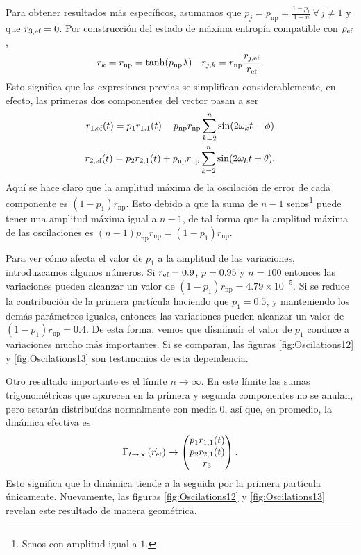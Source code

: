 Para obtener resultados más específicos, asumamos que $p_{j}=p_{\text{np}}=\frac{1-p_{1}}{1-n}\,\forall\,j\neq 1$ y que $r_{3,\text{ef}}=0$. Por construcción del estado de máxima entropía compatible con $\rho_{\text{ef}}$,
\begin{align}
    r_{k}=r_{\text{np}}=\tanh(p_{\text{np}} \lambda) & & r_{j,k}=r_{\text{np}}\frac{r_{j,\text{ef}}}{r_{\text{ef}}}.\nonumber
\end{align}
Esto significa que las expresiones previas se simplifican considerablemente, en efecto, las primeras dos componentes del vector pasan a ser
\begin{equation}\label{eq:}
    \begin{gathered}
        r_{1,\text{ef}}(t)=p_{1}r_{1,1}(t)-p_{\text{np}}r_{\text{np}}\sum_{k=2}^{n}\sin(2\omega_{k} t-\phi)\\
        r_{2,\text{ef}}(t)=p_{2}r_{2,1}(t)+p_{\text{np}}r_{\text{np}}\sum_{k=2}^{n}\sin(2\omega_{k} t+\theta).
    \end{gathered}
\end{equation}
Aquí se hace claro que la amplitud máxima de la oscilación de error de cada componente es $(1-p_{1})r_{\text{np}}$. Esto debido a que la suma de $n-1$ senos\footnote{Senos con amplitud igual a $1$.} puede tener una amplitud máxima igual a $n-1$, de tal forma que la amplitud máxima de las oscilaciones es $(n-1)p_{\text{np}}r_{\text{np}}=(1-p_{1})r_{\text{np}}$.


Para ver cómo afecta el valor de $p_{1}$ a la amplitud de las variaciones, introduzcamos algunos números. Si $r_{\text{ef}}=0.9$, $p=0.95$ y $n=100$ entonces las variaciones pueden alcanzar un valor de $(1-p_{1})r_{\text{np}}=4.79\times 10^{-5}$. Si se reduce la contribución de la primera partícula haciendo que $p_{1}=0.5$, y manteniendo los demás parámetros iguales, entonces las variaciones pueden alcanzar un valor de $(1-p_{1})r_{\text{np}}=0.4$. De esta forma, vemos que disminuir el valor de $p_{1}$ conduce a variaciones mucho más importantes. Si se comparan, las figuras \ref{fig:Oscilations12} y \ref{fig:Oscilations13} son testimonios de esta dependencia. 

Otro resultado importante es el límite $n\rightarrow\infty$. En este límite las sumas trigonométricas que aparecen en la primera y segunda componentes no se anulan, pero estarán distribuídas normalmente con media $0$, así que, en promedio, la dinámica efectiva es
\begin{equation}\label{eq:MeanDynamics}
    \Gamma_{t\rightarrow\infty}(\vec{r}_{\text{ef}})\rightarrow\begin{pmatrix}
        p_{1}r_{1,1}(t)\\
        p_{2}r_{2,1}(t)\\
        r_{3}\\
    \end{pmatrix}.
\end{equation}
Esto significa que la dinámica tiende a la seguida por la primera partícula únicamente. Nuevamente, las figuras \ref{fig:Oscilations12} y \ref{fig:Oscilations13} revelan este resultado de manera geométrica.


